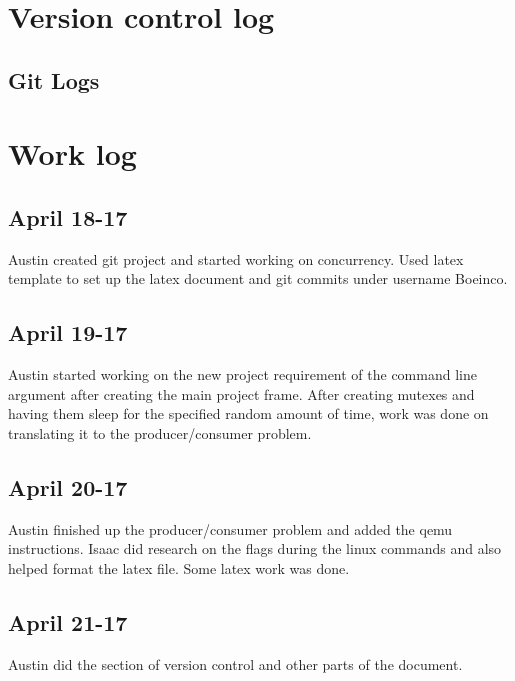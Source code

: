 \documentclass[letterpaper,10pt,titlepage]{article}
\begin{document}
\section{Version control log}
\subsection{Git Logs}


\section{Work log}

\subsection{April 18-17}
Austin created git project and started working on concurrency.  Used latex template to set up the latex document and git commits under username Boeinco.
\subsection{April 19-17}
Austin started working on the new project requirement of the command line argument after creating the main project frame.  After creating mutexes and having them sleep for the specified random amount of time, work was done on translating it to the producer/consumer problem.
\subsection{April 20-17}
Austin finished up the producer/consumer problem and added the qemu instructions. Isaac did research on the flags during the linux commands and also helped format the latex file.  Some latex work was done.
\subsection{April 21-17}
Austin did the section of version control and other parts of the document.

%
%
\end{document}
